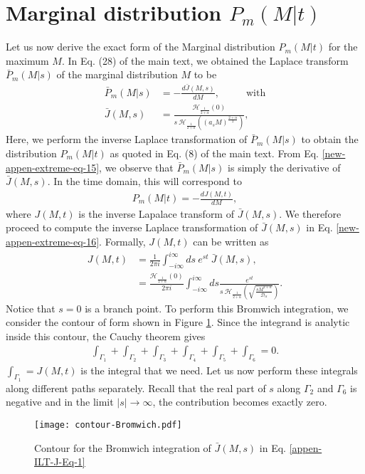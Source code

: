 \documentclass[superscriptaddress,amsmath,amssymb,aps,onecolumn]{revtex4}
\begin{document}
\section{Marginal distribution $P_m(M|t)$}
\label{new-appen-ILT-J}
Let us now derive the exact form of the Marginal distribution $P_m(M|t)$ for the maximum $M$. In Eq. (28) of the main text, we obtained the Laplace transform $\bar{P}_m(M|s)$ of the marginal distribution $M$ to be
\begin{align}
\bar{P}_m(M|s)&  =-\frac{d \bar{J}(M,s)}{dM},~~~~~~~~~~~~\text{with} \label{new-appen-extreme-eq-15} \\
\bar{J}(M,s)&= \frac{\mathcal{H}_{\frac{1}{2+\alpha}} \left(0 \right)}{s ~\mathcal{H}_{\frac{1}{2+\alpha}} \left( (a_s M)^{\frac{2+\alpha}{2}} \right)}, \label{new-appen-extreme-eq-16} 
\end{align}
Here, we perform the inverse Laplace transformation of $\bar{P}_m(M|s)$ to obtain the distribution $P_m(M|t)$ as quoted in Eq. (8) of the main text. From Eq. \eqref{new-appen-extreme-eq-15}, we observe that $\bar{P}_m(M|s)$ is simply the derivative of $\bar{J}(M,s)$. In the time domain, this will correspond to
\begin{align}
P_m(M|t) = - \frac{dJ(M,t)}{dM},
\label{appen-ILT-J-Eq-0}
\end{align}
where $J(M,t)$ is the inverse Lapalace transform of $\bar{J}(M,s)$. We therefore proceed to compute the inverse Laplace transformation of  $\bar{J}(M,s)$ in Eq. \eqref{new-appen-extreme-eq-16}. Formally, $J(M,t)$ can be written as
\begin{align}
J(M,t) &= \frac{1}{2 \pi i} \int _{-i \infty}^{i \infty} ds~ e^{st}~\bar{J}(M,s), \\
& = \frac{\mathcal{H}_{\frac{1}{2+\alpha}} \left(0 \right)}{2 \pi i} \int _{-i \infty}^{i \infty} ds \frac{e^{st}}{s ~\mathcal{H}_{\frac{1}{2+\alpha}} \left( \sqrt{\frac{s M^{2+\alpha}}{\mathcal{D}_{\alpha}}}  \right)}.
\label{appen-ILT-J-Eq-1}
\end{align}
Notice that $s=0$ is a branch point. To perform this Bromwich integration, we consider the contour of form shown in Figure \ref{contour-fig}. Since the integrand is analytic inside this contour, the Cauchy theorem gives
\begin{align}
\int _{\Gamma _1}+\int _{\Gamma _2}+\int _{\Gamma _3}+\int _{\Gamma _4}+\int _{\Gamma _5}+\int _{\Gamma _6} = 0.\label{appen-ILT-J-Eq-2-new}
\end{align}
$\int _{\Gamma _1} = J(M,t)$ is the integral that we need. Let us now perform these integrals along different paths separately. Recall that the real part of $s$ along $\Gamma _2$ and $\Gamma _6$ is negative and in the limit $|s| \to \infty$, the contribution becomes exactly zero.
\begin{figure}[t]
\texttt{[image: contour-Bromwich.pdf]}
\centering
\caption{Contour for the Bromwich integration of $\bar{J}(M,s)$ in Eq. \eqref{appen-ILT-J-Eq-1}}
\label{contour-fig}
\end{figure}
\end{document}
